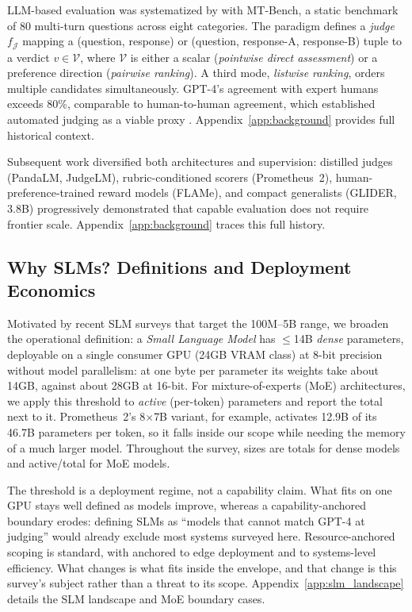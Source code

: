 \documentclass[11pt]{article}
\begin{document}
LLM-based evaluation was systematized by \citet{zheng2023judging} with MT-Bench, a static benchmark of 80 multi-turn questions across eight categories. The paradigm defines a \emph{judge} $f_\mathcal{J}$ mapping a (question, response) or (question, response-A, response-B) tuple to a verdict $v \in \mathcal{V}$, where $\mathcal{V}$ is either a scalar (\emph{pointwise direct assessment}) or a preference direction (\emph{pairwise ranking}). A third mode, \emph{listwise ranking}, orders multiple candidates simultaneously. GPT-4's agreement with expert humans exceeds 80\%, comparable to human-to-human agreement, which established automated judging as a viable proxy \citep{zheng2023judging}. Appendix~\ref{app:background} provides full historical context.

Subsequent work diversified both architectures and supervision: distilled judges (PandaLM, JudgeLM), rubric-conditioned scorers (Prometheus~2), human-preference-trained reward models (FLAMe), and compact generalists (GLIDER, 3.8B) progressively demonstrated that capable evaluation does not require frontier scale. Appendix~\ref{app:background} traces this full history.

\subsection{Why SLMs? Definitions and Deployment Economics}

Motivated by recent SLM surveys \citep{lu2024small} that target the 100M--5B range, we broaden the operational definition: a \emph{Small Language Model} has $\leq$14B \emph{dense} parameters, deployable on a single consumer GPU (24GB VRAM class) at 8-bit precision without model parallelism: at one byte per parameter its weights take about 14GB, against about 28GB at 16-bit. For mixture-of-experts (MoE) architectures, we apply this threshold to \emph{active} (per-token) parameters and report the total next to it. Prometheus~2's 8$\times$7B variant, for example, activates 12.9B of its 46.7B parameters per token, so it falls inside our scope while needing the memory of a much larger model. Throughout the survey, sizes are totals for dense models and active/total for MoE models.

The threshold is a deployment regime, not a capability claim. What fits on one GPU stays well defined as models improve, whereas a capability-anchored boundary erodes: defining SLMs as ``models that cannot match GPT-4 at judging'' would already exclude most systems surveyed here. Resource-anchored scoping is standard, with \citet{lu2024small} anchored to edge deployment and \citet{wan2023efficient} to systems-level efficiency. What changes is what fits inside the envelope, and that change is this survey's subject rather than a threat to its scope. Appendix~\ref{app:slm_landscape} details the SLM landscape and MoE boundary cases.
\end{document}
